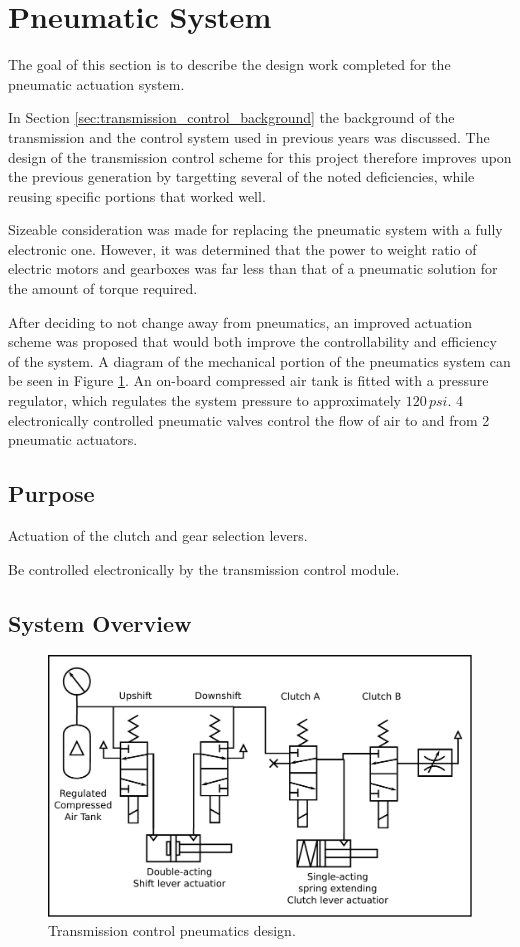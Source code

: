 \section{Pneumatic System}

The goal of this section is to describe the design work completed for the pneumatic actuation system.

In Section \ref{sec:transmission_control_background} the background of the transmission and the control system used in previous years was discussed. The design of the transmission control scheme for this project therefore improves upon the previous generation by targetting several of the noted deficiencies, while reusing specific portions that worked well.

Sizeable consideration was made for replacing the pneumatic system with a fully electronic one. However, it was determined that the power to weight ratio of electric motors and gearboxes was far less than that of a pneumatic solution for the amount of torque required.

After deciding to not change away from pneumatics, an improved actuation scheme was proposed that would both improve the controllability and efficiency of the system. A diagram of the mechanical portion of the pneumatics system can be seen in Figure \ref{fig:pneumatics_design}. An on-board compressed air tank is fitted with a pressure regulator, which regulates the system pressure to approximately $120\,psi$. 4 electronically controlled pneumatic valves control the flow of air to and from 2 pneumatic actuators.

\subsection{Purpose}

Actuation of the clutch and gear selection levers. 

Be controlled electronically by the transmission control module.


\subsection{System Overview}

\begin{figure}
\centering
\includegraphics[scale=0.5]{design/figures/pneumatics}
\caption{Transmission control pneumatics design.}
\label{fig:pneumatics_design}
\end{figure}

